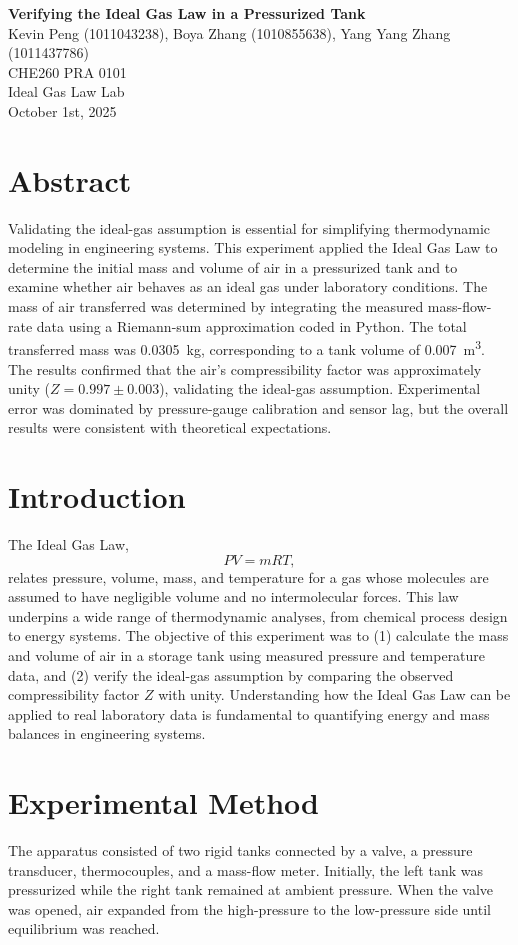 \documentclass[12pt]{article}
\begin{document}
\begin{center}
\textbf{\Large Verifying the Ideal Gas Law in a Pressurized Tank} \\[0.5em]
Kevin Peng (1011043238), Boya Zhang (1010855638), Yang Yang Zhang (1011437786)\\[0.5em]
CHE260 PRA 0101 \\
Ideal Gas Law Lab \\
October 1st, 2025 \\
\end{center}

\section*{Abstract}
Validating the ideal-gas assumption is essential for simplifying thermodynamic modeling in engineering systems.
This experiment applied the Ideal Gas Law to determine the initial mass and volume of air in a pressurized tank and to examine whether air behaves as an ideal gas under laboratory conditions. The mass of air transferred was determined by integrating the measured mass-flow-rate data using a Riemann-sum approximation coded in Python. The total transferred mass was \SI{0.0305}{\kilogram}, corresponding to a tank volume of \SI{0.007}{\metre\cubed}. The results confirmed that the air’s compressibility factor was approximately unity (\(Z = 0.997 \pm 0.003\)), validating the ideal-gas assumption. Experimental error was dominated by pressure-gauge calibration and sensor lag, but the overall results were consistent with theoretical expectations.

\section*{Introduction}
The Ideal Gas Law,
\[
PV = m R T,
\]
relates pressure, volume, mass, and temperature for a gas whose molecules are assumed to have negligible volume and no intermolecular forces. This law underpins a wide range of thermodynamic analyses, from chemical process design to energy systems. The objective of this experiment was to (1) calculate the mass and volume of air in a storage tank using measured pressure and temperature data, and (2) verify the ideal-gas assumption by comparing the observed compressibility factor \(Z\) with unity. Understanding how the Ideal Gas Law can be applied to real laboratory data is fundamental to quantifying energy and mass balances in engineering systems.

\section*{Experimental Method}
The apparatus consisted of two rigid tanks connected by a valve, a pressure transducer, thermocouples, and a mass-flow meter. Initially, the left tank was pressurized while the right tank remained at ambient pressure. When the valve was opened, air expanded from the high-pressure to the low-pressure side until equilibrium was reached.
\end{document}
